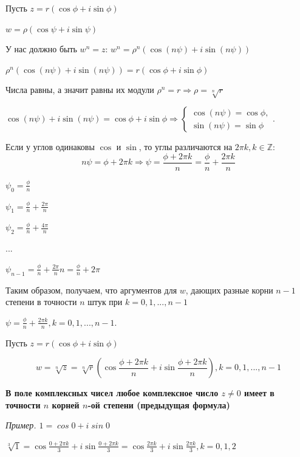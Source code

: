 \documentclass[a4paper]{article}
\begin{document}
{\begin{small}
Пусть $z = r(\cos \phi + i \sin \phi)$

$w = \rho (\cos \psi + i \sin \psi)$

У нас должно быть $w^n = z$: $w^n = \rho^n (\cos (n \psi) + i \sin (n \psi))$

$\rho^n (\cos (n \psi) + i \sin (n \psi)) = r (\cos  \phi + i \sin \phi)$

Числа равны, а значит равны их модули $\rho^n = r \Rightarrow \rho = \sqrt[n]{r}$

$\cos (n \psi) + i \sin (n \psi) = \cos  \phi + i \sin \phi \Rightarrow \begin{cases}
\cos (n \psi) = \cos \phi,
\\
\sin (n \psi) = \sin \phi
\end{cases}$.

Если у углов одинаковы $\cos$ и $\sin$, то углы различаются на $2\pi k, k \in \mathbb{Z}$:
\begin{equation}
n \psi = \phi + 2\pi k \Rightarrow \psi = \frac{\phi + 2 \pi k}{n} = \frac{\phi}{n} + \frac{2 \pi k}{n}
\end{equation}

$\displaystyle \psi_0 = \frac{\phi}{n}$

$\displaystyle \psi_1 = \frac{\phi}{n} + \frac{2\pi}{n}$

$\displaystyle \psi_2 = \frac{\phi}{n} + \frac{4\pi}{n}$

...

$\displaystyle \psi_{n-1} = \frac{\phi}{n} + \frac{2\pi}{n}n = \frac{\phi}{n} + 2\pi$

Таким образом, получаем, что аргументов для $w$, дающих разные корни $n-1$ степени в точности $n$ штук при $k =0, 1, ..., n-1$

$\psi = \frac{\phi}{n} + \frac{2\pi k}{n}, k = 0, 1, ..., n-1$.


Пусть $z = r(\cos \phi + i \sin \phi)$

\begin{equation}
\displaystyle w = \sqrt[n]{z} = \sqrt[n]{r} \left( \cos \frac{\phi + 2\pi k}{n} + i \sin \frac{\phi + 2\pi k}{n} \right), k = 0,1,...,n-1
\end{equation}

\textbf{В поле комплексных чисел любое комплексное число $z \neq 0$ имеет в точности $n$ корней $n$-ой степени (предыдущая формула)}

\textit{Пример. $\mathit{1 = \cos 0 + i \sin 0}$}

$\displaystyle \sqrt[3]{1} = \cos \frac{0+2\pi k}{3} + i \sin \frac{0 + 2\pi k}{3} = \cos \frac{2 \pi k}{3} + i \sin \frac{2 \pi k}{3}, k = 0,1,2$


\end{small}}
\end{document}
